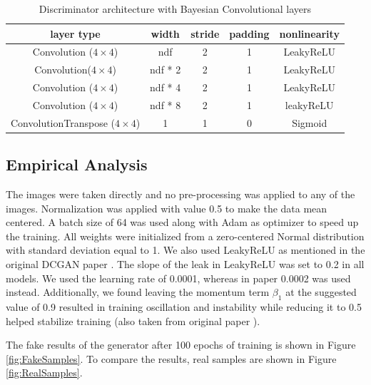 \begin{table}[H]
    \centering
    \renewcommand{\arraystretch}{2}
    \begin{tabular}{c c c c c} 
 \hline
 layer type & width & stride & padding & nonlinearity \\ [0.5ex] 
 \hline
 Convolution ($4\times4$) & ndf & 2 & 1  & LeakyReLU \\ 
 

 Convolution($4\times4$) & ndf * 2 & 2 & 1  & LeakyReLU \\
 
 
 Convolution ($4\times4$) & ndf * 4 & 2 & 1 & LeakyReLU \\
 
 Convolution ($4\times4$) & ndf * 8 & 2 & 1  & leakyReLU \\
 
 ConvolutionTranspose ($4\times4$) & 1 & 1 & 0 & Sigmoid \\ [1ex] 
 \hline
\end{tabular}
\renewcommand{\arraystretch}{1}
\caption{Discriminator architecture with Bayesian Convolutional layers}
\label{tab:DiscriminatorArchitecture}
\end{table}


\subsection{Empirical Analysis}

The images were taken directly and no pre-processing was applied to any of the images. Normalization was applied with value 0.5 to make the data mean centered. A batch size of 64 was used along with Adam \citep{kingma2014adam} as optimizer to speed up the training. All weights were initialized from a zero-centered Normal distribution with standard deviation equal to 1. We also used LeakyReLU as mentioned in the original DCGAN paper \cite{DBLP:journals/corr/RadfordMC15}. The slope of the leak in LeakyReLU was set to 0.2 in all models. We used the learning rate of 0.0001, whereas in paper 0.0002 was used instead. Additionally, we found leaving the momentum term $\beta_1$ at the suggested value of 0.9 resulted in training oscillation and instability while reducing it to 0.5 helped stabilize training (also taken from original paper \cite{DBLP:journals/corr/RadfordMC15}).

The fake results of the generator after 100 epochs of training is shown in Figure \ref{fig:FakeSamples}. To compare the results, real samples are shown in Figure \ref{fig:RealSamples}.  

